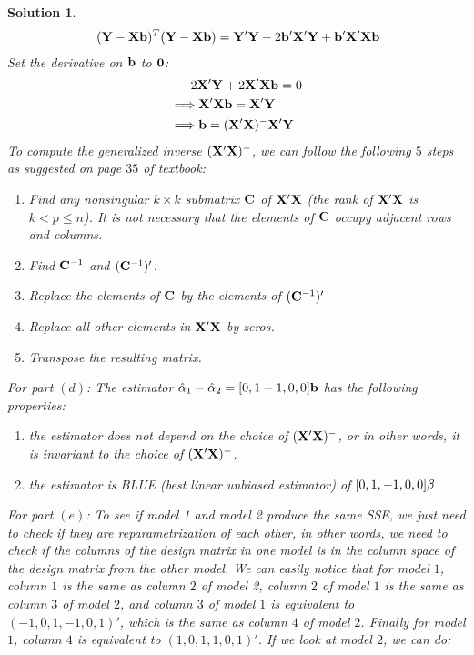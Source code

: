 \documentclass[11pt]{article}
\newtheorem{sol}{Solution}
\begin{document}
\begin{sol}
\begin{align*}
  	&\ ({\bf Y} - {\bf X}{\bf b})^T({\bf Y} - {\bf X}{\bf b}) = {\bf Y}'{\bf Y} - 2{\bf b}'{\bf X}'{\bf Y} + {\bf b}'{\bf X}'{\bf X}{\bf b}\\
  \end{align*}
  Set the derivative on ${\bf b}$ to ${\bf 0}$:
  \begin{align*}
  	&\ -2{\bf X}'{\bf Y} + 2{\bf X}'{\bf X}{\bf b} = 0\\
  	&\Longrightarrow {\bf X}'{\bf X}{\bf b} = {\bf X}'{\bf Y}\\
  	&\Longrightarrow {\bf b} = ({\bf X}'{\bf X})^{-}{\bf X}'{\bf Y}
  \end{align*}
  To compute the generalized inverse $({\bf X}'{\bf X})^{-}$, we can follow the following $5$ steps as suggested on page $35$ of textbook:\vskip 2mm
  \begin{enumerate}
  	\item Find any nonsingular $k \times k$ submatrix ${\bf C}$ of ${\bf X}'{\bf X}$ (the rank of ${\bf X}'{\bf X}$ is $k < p \leq n$). It is not necessary that the elements of ${\bf C}$ occupy adjacent rows and columns.
  	\item Find ${\bf C}^{-1}$ and $({\bf C}^{-1})'$.
  	\item Replace the elements of ${\bf C}$ by the elements of $({\bf C}^{-1})'$
  	\item Replace all other elements in ${\bf X}'{\bf X}$ by zeros.
  	\item Transpose the resulting matrix.
  \end{enumerate}
  For part $(d)$:\vskip 2mm
  The estimator $\hat{\alpha}_1 - \hat{\alpha}_2 = [0 ,1 -1 ,0, 0]{\bf b}$ has the following properties:
  \begin{enumerate}
  	\item the estimator does not depend on the choice of $({\bf X}'{\bf X})^{-}$, or in other words, it is invariant to the choice of $({\bf X}'{\bf X})^{-}$.
  	\item the estimator is BLUE (best linear unbiased estimator) of $[0, 1, -1, 0, 0]{\bf \beta}$
  \end{enumerate}
  For part $(e)$:\vskip 2mm
  To see if model 1 and model 2 produce the same SSE, we just need to check if they are reparametrization of each other, in other words, we need to check if the columns of the design matrix in one model is in the column space of the design matrix from the other model.\vskip 2mm
  We can easily notice that for model $1$, column $1$ is the same as column $2$ of model 2, column $2$ of model $1$ is the same as column $3$ of model $2$, and column $3$ of model $1$ is equivalent to $(-1, 0, 1, -1, 0, 1)'$, which is the same as column $4$ of model $2$. Finally for model $1$, column $4$ is equivalent to $(1, 0, 1, 1, 0, 1)'$. If we look at model $2$, we can do:

\end{sol}
\end{document}
